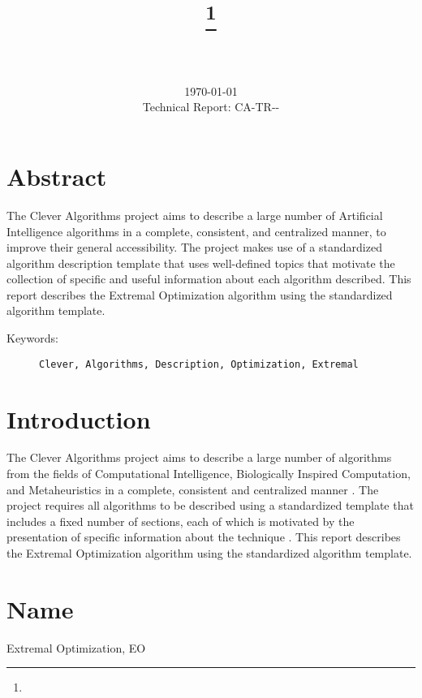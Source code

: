 \documentclass[a4paper, 11pt]{article}
\title{{\myreporttitle}\footnote{\myreportlicense}}
\author{\myreportauthor\\{\myreportemail}\\\small\myreportproject}
\date{\today\\{\small{Technical Report: CA-TR-{\myreportdate}-\myreportversion}}}
\begin{document}
\maketitle

\section*{Abstract}
The Clever Algorithms project aims to describe a large number of Artificial Intelligence algorithms in a complete, consistent, and centralized manner, to improve their general accessibility. 
The project makes use of a standardized algorithm description template that uses well-defined topics that motivate the collection of specific and useful information about each algorithm described.
This report describes the Extremal Optimization algorithm using the standardized algorithm template.

\begin{description}
	\item[Keywords:] {\small\texttt{Clever, Algorithms, Description, Optimization, Extremal}}
\end{description} 

\section{Introduction} 
\label{sec:intro}
The Clever Algorithms project aims to describe a large number of algorithms from the fields of Computational Intelligence, Biologically Inspired Computation, and Metaheuristics in a complete, consistent and centralized manner \cite{Brownlee2010}.
The project requires all algorithms to be described using a standardized template that includes a fixed number of sections, each of which is motivated by the presentation of specific information about the technique \cite{Brownlee2010a}.
This report describes the Extremal Optimization algorithm using the standardized algorithm template.

\section{Name} 
\label{sec:name}
Extremal Optimization, EO
\end{document}
